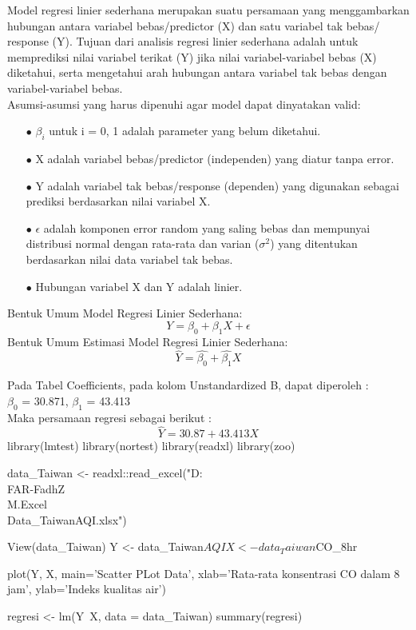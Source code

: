\begin{sloppypar}
Model regresi linier sederhana merupakan suatu persamaan yang menggambarkan hubungan antara variabel bebas/predictor (X) dan satu variabel tak bebas/ response (Y). Tujuan dari analisis regresi linier sederhana adalah untuk memprediksi nilai variabel terikat (Y) jika nilai variabel-variabel bebas (X) diketahui, serta mengetahui arah hubungan antara variabel tak bebas dengan variabel-variabel bebas.
\\Asumsi-asumsi yang harus dipenuhi agar model dapat dinyatakan valid:
\begin{enumerate}
    \item[$\bullet$] $\beta_i$ untuk i = 0, 1 adalah parameter yang belum diketahui.
    \item[$\bullet$] X adalah variabel bebas/predictor (independen) yang diatur tanpa error.
    \item[$\bullet$] Y adalah variabel tak bebas/response (dependen) yang digunakan sebagai prediksi berdasarkan nilai variabel X.
    \item[$\bullet$] $\epsilon$ adalah komponen error random yang saling bebas dan mempunyai distribusi normal dengan rata-rata dan varian ($\sigma^2$) yang ditentukan berdasarkan nilai data variabel tak bebas.
    \item[$\bullet$] Hubungan variabel X dan Y adalah linier.
\end{enumerate}
\end{sloppypar}

\noindent Bentuk Umum Model Regresi Linier Sederhana:
\begin{equation}
    Y = \beta_{0} + \beta_{1}X + \epsilon
    \label{eq1}
\end{equation}
Bentuk Umum Estimasi Model Regresi Linier Sederhana: 
\begin{equation}
    \hat{Y} = \widehat{\beta_{0}} + \widehat{\beta_{1}}X
    \label{eq2}
\end{equation}
\begin{test}{
    Pada Tabel Coefficients, pada kolom Unstandardized B, dapat diperoleh : \\
    $\beta_0$ = 30.871, $\beta_1$ = 43.413 \\
    Maka persamaan regresi sebagai berikut : \\
    \begin{equation*}
        \hat{Y} = 30.87 + 43.413 X
    \end{equation*}
}
library(lmtest)
library(nortest)
library(readxl)
library(zoo)

data_Taiwan <- readxl::read_excel("D:\\FAR-FadhZ\\M.Excel\\Data_TaiwanAQI.xlsx")

View(data_Taiwan)
Y <- data_Taiwan$AQI
X <- data_Taiwan$CO_8hr

plot(Y, X, main='Scatter PLot Data', xlab='Rata-rata konsentrasi CO dalam 8 jam', ylab='Indeks kualitas air')

regresi <- lm(Y~X, data = data_Taiwan)
summary(regresi)
\end{test}

